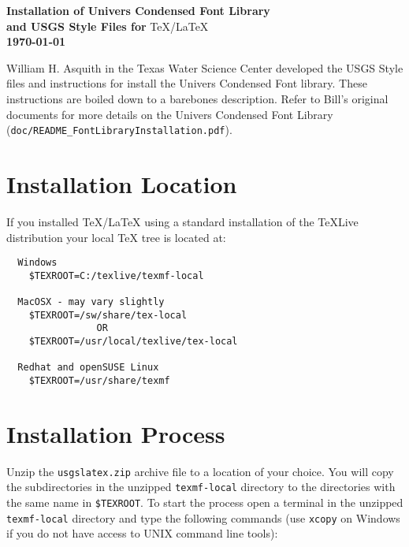 \documentclass[11pt]{article}
\begin{document}
\renewcommand\sfdefault{fun}


\begin{centering}
\noindent \textsf{\bfseries \Large Installation of Univers Condensed Font Library \\ and USGS Style Files for} \TeX/\LaTeX \\
\normalsize  \textsf{\bfseries \today \\}
\end{centering}

\addvspace{\baselineskip}

William H. Asquith in the Texas Water Science Center developed the USGS Style files and instructions for install the Univers Condensed Font library. These instructions are boiled down to a barebones description. Refer to Bill's original documents for more details on the Univers Condensed Font Library (\texttt{doc/README\_FontLibraryInstallation.pdf}).

\section*{\textsf{Installation Location}}

If you installed \TeX/\LaTeX \hspace{1pt} using a standard installation of the \TeX Live distribution your local \TeX \hspace{1pt} tree is located at:

\begin{verbatim}
  Windows
    $TEXROOT=C:/texlive/texmf-local

  MacOSX - may vary slightly
    $TEXROOT=/sw/share/tex-local
                OR
    $TEXROOT=/usr/local/texlive/tex-local

  Redhat and openSUSE Linux                          
    $TEXROOT=/usr/share/texmf
\end{verbatim}

\section*{\textsf{Installation Process}}

Unzip the \texttt{usgslatex.zip} archive file to a location of your choice. You will copy the subdirectories in the unzipped \texttt{texmf-local} directory to the directories with the same name in \texttt{\$TEXROOT}. To start the process open a terminal in the unzipped \texttt{texmf-local} directory and type the following commands (use \texttt{xcopy} on Windows if you do not have access to UNIX command line tools):
\end{document}
